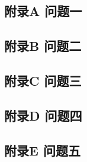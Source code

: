 \documentclass[a4paper, 12pt]{article}
\numberwithin{equation}{section}
\begin{document}
    {}
    \newpage


    {}
        \subsection*{附录A \hspace{2em} 问题一}
            

        \subsection*{附录B \hspace{2em} 问题二}
            

        \subsection*{附录C \hspace{2em} 问题三}
            

        \subsection*{附录D \hspace{2em} 问题四}
            

        \subsection*{附录E \hspace{2em} 问题五}
\end{document}
